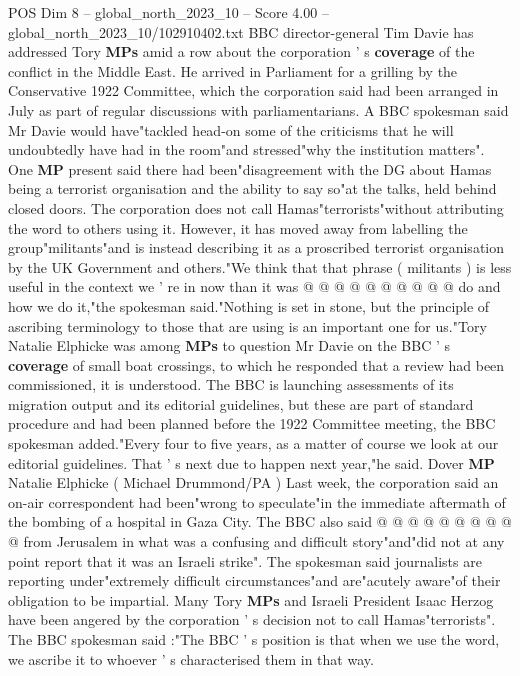 \begin{textsample}{POS Dim 8 – global\_north\_2023\_10 – Score 4.00 – global\_north\_2023\_10/102910402.txt}  \label{ex:f8_pos_207}
BBC director-general Tim Davie has addressed Tory \textbf{MPs} amid a row about the corporation ' s \textbf{coverage} of the conflict in the Middle East.
He arrived in Parliament for a grilling by the Conservative 1922 Committee, which the corporation said had been arranged in July as part of regular discussions with parliamentarians.
A BBC spokesman said Mr Davie would have"tackled head-on some of the criticisms that he will undoubtedly have had in the room"and stressed"why the institution matters".
One \textbf{MP} present said there had been"disagreement with the DG about Hamas being a terrorist organisation and the ability to say so"at the talks, held behind closed doors.
The corporation does not call Hamas"terrorists"without attributing the word to others using it.
However, it has moved away from labelling the group"militants"and is instead describing it as a proscribed terrorist organisation by the UK Government and others."We think that that phrase ( militants ) is less useful in the context we ' re in now than it was @ @ @ @ @ @ @ @ @ @ do and how we do it,"the spokesman said."Nothing is set in stone, but the principle of ascribing terminology to those that are using is an important one for us."Tory Natalie Elphicke was among \textbf{MPs} to question Mr Davie on the BBC ' s \textbf{coverage} of small boat crossings, to which he responded that a review had been commissioned, it is understood.
The BBC is launching assessments of its migration output and its editorial guidelines, but these are part of standard procedure and had been planned before the 1922 Committee meeting, the BBC spokesman added."Every four to five years, as a matter of course we look at our editorial guidelines.
That ' s next due to happen next year,"he said.
Dover \textbf{MP} Natalie Elphicke ( Michael Drummond/PA ) Last week, the corporation said an on-air correspondent had been"wrong to speculate"in the immediate aftermath of the bombing of a hospital in Gaza City.
The BBC also said @ @ @ @ @ @ @ @ @ @ from Jerusalem in what was a confusing and difficult story"and"did not at any point report that it was an Israeli strike".
The spokesman said journalists are reporting under"extremely difficult circumstances"and are"acutely aware"of their obligation to be impartial.
Many Tory \textbf{MPs} and Israeli President Isaac Herzog have been angered by the corporation ' s decision not to call Hamas"terrorists".
The BBC spokesman said :"The BBC ' s position is that when we use the word, we ascribe it to whoever ' s characterised them in that way.

\end{textsample}
